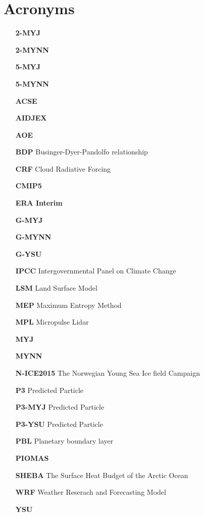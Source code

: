 \section{Acronyms}
\begin{enumerate}
    \item[\textbf{2-MYJ}]
    \item[\textbf{2-MYNN}]
    \item[\textbf{5-MYJ}]
    \item[\textbf{5-MYNN}]
    \item[\textbf{ACSE}]
    \item[\textbf{AIDJEX}]
    \item[\textbf{AOE}]
    \item[\textbf{BDP}] Businger-Dyer-Pandolfo relationship
    \item[\textbf{CRF}] Cloud Radiative Forcing
    \item[\textbf{CMIP5}]
    \item[\textbf{ERA Interim}] 
    \item[\textbf{G-MYJ}]
    \item[\textbf{G-MYNN}]
    \item[\textbf{G-YSU}]
    \item[\textbf{IPCC}] Intergovernmental Panel on Climate Change
    \item[\textbf{LSM}] Land Surface Model
    \item[\textbf{MEP}] Maximum Entropy Method
    \item[\textbf{MPL}] Micropulse Lidar
    \item[\textbf{MYJ}]
    \item[\textbf{MYNN}]
    \item[\textbf{N-ICE2015}] The Norwegian Young Sea Ice field Campaign 
    \item[\textbf{P3}] Predicted Particle 
    \item[\textbf{P3-MYJ}] Predicted Particle 
    \item[\textbf{P3-YSU}] Predicted Particle 
    \item[\textbf{PBL}] Planetary boundary layer
    \item[\textbf{PIOMAS}]
    \item[\textbf{SHEBA}] The Surface Heat Budget of the Arctic Ocean
    \item[\textbf{WRF}] Weather Reserach and Forecasting Model
    \item[\textbf{YSU}]
\end{enumerate}